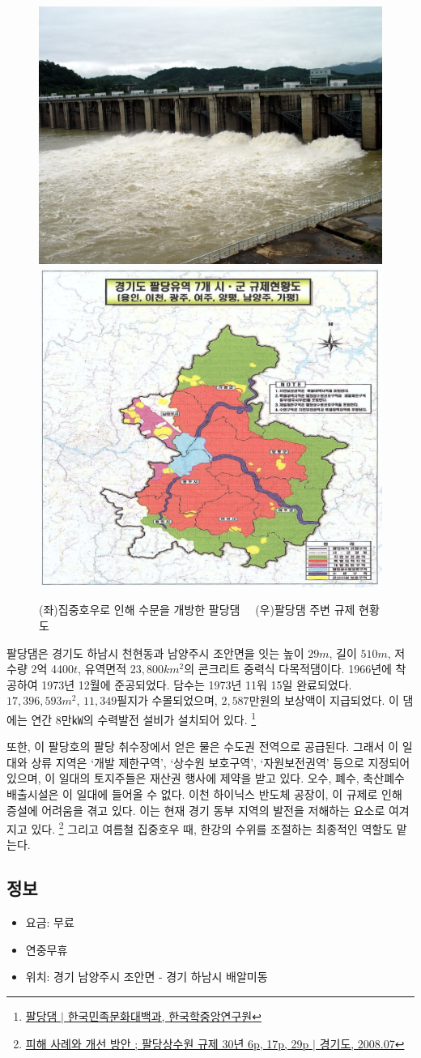  
\begin{figure}[ht]
   \centering
   \includegraphics[width=.4\textwidth]{img/팔당댐.jpg}
   \includegraphics[width=.4\textwidth]{img/규제현황도.PNG}
    
   \caption{(좌)집중호우로 인해 수문을 개방한 팔당댐\protect\footnotemark $\quad$ (우)팔당댐 주변 규제 현황도\protect\footnotemark}
   \label{fig:my_labe9}
\end{figure}
\footnotetext{\ref{paldang}}


팔당댐은 경기도 하남시 천현동과 남양주시 조안면을 잇는
높이 $29m$, 길이 $510m$, 저수량 2억 4400$t$, 유역면적 $23,800km^2$의 콘크리트 중력식 다목적댐이다.
1966년에 착공하여 1973년 12월에 준공되었다.
담수는 1973년 11워 15일 완료되었다.
$17,396,593 m^2$, $11,349$필지가 수몰되었으며, $2,587$만원의 보상액이 지급되었다.
이 댐에는 연간 8만㎾의 수력발전 설비가 설치되어 있다.
\footnote{\href{https://terms.naver.com/entry.naver?docId=531161&cid=46631&categoryId=46631}{팔당댐 $|$ 한국민족문화대백과, 한국학중앙연구원}}


또한, 이 팔당호의 팔당 취수장에서 얻은 물은 수도권 전역으로 공급된다.
그래서 이 일대와 상류 지역은 `개발 제한구역', `상수원 보호구역', `자원보전권역'
등으로 지정되어 있으며,
이 일대의 토지주들은 재산권 행사에 제약을 받고 있다.
오수, 폐수, 축산폐수 배출시설은 이 일대에 들어올 수 없다.
이천 하이닉스 반도체 공장이, 이 규제로 인해 증설에 어려움을 겪고 있다.
이는 현재 경기 동부 지역의 발전을 저해하는 요소로 여겨지고 있다.
\footnote{\label{paldang}\href{https://memory.library.kr/items/show/37492}{피해 사례와 개선 방안 ; 팔당상수원 규제 30년 6p, 17p, 29p $|$ 경기도, 2008.07}}
그리고 여름철 집중호우 때, 한강의 수위를 조절하는 최종적인 역할도 맡는다.

\subsection{정보}
\begin{itemize}
    \item 요금: 무료
    \item 연중무휴
    \item 위치: 경기 남양주시 조안면 - 경기 하남시 배알미동
\end{itemize}